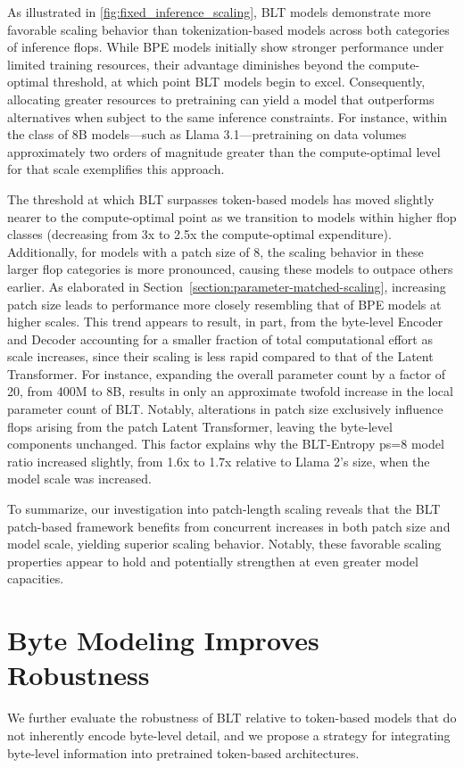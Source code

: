 As illustrated in \autoref{fig:fixed_inference_scaling}, {\textsc BLT} models demonstrate more favorable scaling behavior than tokenization-based models across both categories of inference flops. While BPE models initially show stronger performance under limited training resources, their advantage diminishes beyond the compute-optimal threshold, at which point {\textsc BLT} models begin to excel. Consequently, allocating greater resources to pretraining can yield a model that outperforms alternatives when subject to the same inference constraints. For instance, within the class of 8B models—such as Llama 3.1—pretraining on data volumes approximately two orders of magnitude greater than the compute-optimal level for that scale exemplifies this approach.

The threshold at which {\textsc BLT} surpasses token-based models has moved slightly nearer to the compute-optimal point as we transition to models within higher flop classes (decreasing from 3x to 2.5x the compute-optimal expenditure). Additionally, for models with a patch size of 8, the scaling behavior in these larger flop categories is more pronounced, causing these models to outpace others earlier. As elaborated in Section~\ref{section:parameter-matched-scaling}, increasing patch size leads to performance more closely resembling that of BPE models at higher scales. This trend appears to result, in part, from the byte-level Encoder and Decoder accounting for a smaller fraction of total computational effort as scale increases, since their scaling is less rapid compared to that of the Latent Transformer. For instance, expanding the overall parameter count by a factor of 20, from 400M to 8B, results in only an approximate twofold increase in the local parameter count of {\textsc BLT}. Notably, alterations in patch size exclusively influence flops arising from the patch Latent Transformer, leaving the byte-level components unchanged. This factor explains why the {\textsc BLT}-Entropy ps=8 model ratio increased slightly, from 1.6x to 1.7x relative to Llama 2's size, when the model scale was increased.

To summarize, our investigation into patch-length scaling reveals that the {\textsc BLT} patch-based framework benefits from concurrent increases in both patch size and model scale, yielding superior scaling behavior. Notably, these favorable scaling properties appear to hold and potentially strengthen at even greater model capacities.

\section{Byte Modeling Improves Robustness} We further evaluate the robustness of {\textsc BLT} relative to token-based models that do not inherently encode byte-level detail, and we propose a strategy for integrating byte-level information into pretrained token-based architectures.
\label{sec:robustness}

